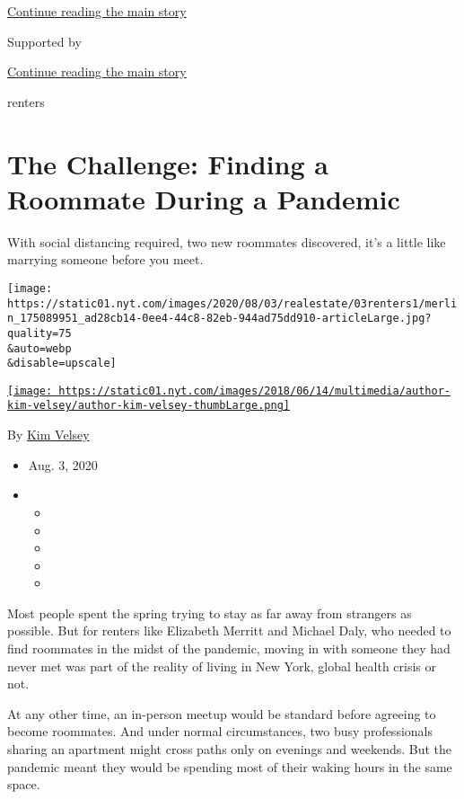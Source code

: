 \protect\hyperlink{after-top}{Continue reading the main story}

Supported by

\protect\hyperlink{after-sponsor}{Continue reading the main story}

renters

\hypertarget{the-challenge-finding-a-roommate-during-a-pandemic}{%
\section{The Challenge: Finding a Roommate During a
Pandemic}\label{the-challenge-finding-a-roommate-during-a-pandemic}}

With social distancing required, two new roommates discovered, it's a
little like marrying someone before you meet.

\texttt{[image: https://static01.nyt.com/images/2020/08/03/realestate/03renters1/merlin\_175089951\_ad28cb14-0ee4-44c8-82eb-944ad75dd910-articleLarge.jpg?quality=75\\\&auto=webp\\\&disable=upscale]}

\href{https://www.nytimes.com/by/kim-velsey}{\texttt{[image: https://static01.nyt.com/images/2018/06/14/multimedia/author-kim-velsey/author-kim-velsey-thumbLarge.png]}}

By \href{https://www.nytimes.com/by/kim-velsey}{Kim Velsey}

\begin{itemize}
\item
  Aug. 3, 2020
\item
  \begin{itemize}
  \item
  \item
  \item
  \item
  \item
  \end{itemize}
\end{itemize}

Most people spent the spring trying to stay as far away from strangers
as possible. But for renters like Elizabeth Merritt and Michael Daly,
who needed to find roommates in the midst of the pandemic, moving in
with someone they had never met was part of the reality of living in New
York, global health crisis or not.

At any other time, an in-person meetup would be standard before agreeing
to become roommates. And under normal circumstances, two busy
professionals sharing an apartment might cross paths only on evenings
and weekends. But the pandemic meant they would be spending most of
their waking hours in the same space.

